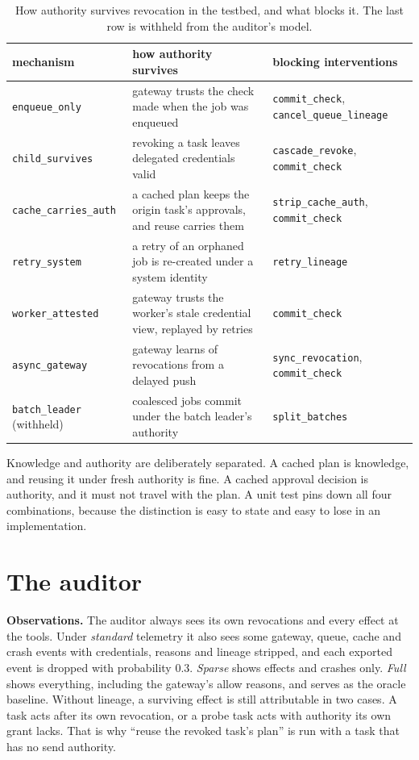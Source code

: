 \documentclass[10pt]{article}
\begin{document}
\begin{table}[h]\footnotesize\centering
\caption{How authority survives revocation in the testbed, and what blocks it. The last row is withheld from the auditor's model.}
\begin{tabularx}{\textwidth}{@{}l X l@{}}\toprule
mechanism & how authority survives & blocking interventions\\\midrule
\texttt{enqueue\_only} & gateway trusts the check made when the job was enqueued & \texttt{commit\_check}, \texttt{cancel\_queue\_lineage}\\
\texttt{child\_survives} & revoking a task leaves delegated credentials valid & \texttt{cascade\_revoke}, \texttt{commit\_check}\\
\texttt{cache\_carries\_auth} & a cached plan keeps the origin task's approvals, and reuse carries them & \texttt{strip\_cache\_auth}, \texttt{commit\_check}\\
\texttt{retry\_system} & a retry of an orphaned job is re-created under a system identity & \texttt{retry\_lineage}\\
\texttt{worker\_attested} & gateway trusts the worker's stale credential view, replayed by retries & \texttt{commit\_check}\\
\texttt{async\_gateway} & gateway learns of revocations from a delayed push & \texttt{sync\_revocation}, \texttt{commit\_check}\\
\texttt{batch\_leader} (withheld) & coalesced jobs commit under the batch leader's authority & \texttt{split\_batches}\\
\bottomrule\end{tabularx}
\end{table}

Knowledge and authority are deliberately separated. A cached plan is knowledge, and reusing it under fresh authority is fine. A cached approval decision is authority, and it must not travel with the plan. A unit test pins down all four combinations, because the distinction is easy to state and easy to lose in an implementation.

\section{The auditor}
\textbf{Observations.} The auditor always sees its own revocations and every effect at the tools. Under \emph{standard} telemetry it also sees some gateway, queue, cache and crash events with credentials, reasons and lineage stripped, and each exported event is dropped with probability 0.3. \emph{Sparse} shows effects and crashes only. \emph{Full} shows everything, including the gateway's allow reasons, and serves as the oracle baseline. Without lineage, a surviving effect is still attributable in two cases. A task acts after its own revocation, or a probe task acts with authority its own grant lacks. That is why ``reuse the revoked task's plan'' is run with a task that has no send authority.
\end{document}

